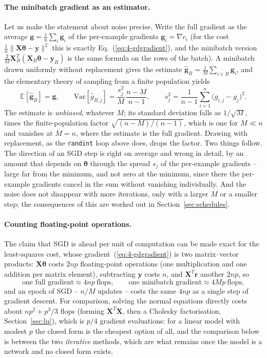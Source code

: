 \paragraph{The minibatch gradient as an estimator.}
Let us make the statement about noise precise.  Write the full gradient as
the average $\bm{g}=\frac1n\sum_i\bm{g}_i$ of the per-example gradients
$\bm{g}_i=\nabla c_i$ (for the cost $\frac1n\|\bm{X}\bm{\theta}-\bm{y}\|^{2}$
this is exactly Eq.~(\ref{eq:4-gdgradient}), and the minibatch version
$\frac{2}{M}\bm{X}_B^{T}(\bm{X}_B\bm{\theta}-\bm{y}_B)$ is the same formula
on the rows of the batch).  A minibatch drawn uniformly without replacement
gives the estimate $\hat{\bm{g}}_B=\frac1M\sum_{i\in B}\bm{g}_i$, and the
elementary theory of sampling from a finite population yields
\begin{equation}
  \mathbb{E}[\hat{\bm{g}}_B]=\bm{g},
  \qquad
  \mathrm{Var}[\hat g_{B,j}]=\frac{s_j^{2}}{M}\,\frac{n-M}{n-1},
  \qquad
  s_j^{2}=\frac{1}{n-1}\sum_{i=1}^{n}\bigl(g_{i,j}-g_j\bigr)^{2}.
  \label{eq:4-minibatchvar}
\end{equation}
The estimate is \emph{unbiased}, whatever $M$; its standard deviation falls
as $1/\sqrt{M}$, times the finite-population factor $\sqrt{(n-M)/(n-1)}$,
which is one for $M\ll n$ and vanishes at $M=n$, where the estimate is the
full gradient.  Drawing with replacement, as the \texttt{randint} loop above
does, drops the factor.  Two things follow.  The direction of an SGD step is
right on average and wrong in detail, by an amount that depends on
$\bm{\theta}$ through the spread $s_j$ of the per-example gradients -- large
far from the minimum, and not zero at the minimum, since there the
per-example gradients cancel in the sum without vanishing individually.  And
the noise does not disappear with more iterations, only with a larger $M$ or
a smaller step; the consequences of this are worked out in
Section~\ref{sec:schedules}.

\paragraph{Counting floating-point operations.}
The claim that SGD is ahead per unit of computation can be made exact for the
least-squares cost, whose gradient~(\ref{eq:4-gdgradient}) is two
matrix--vector products: $\bm{X}\bm{\theta}$ costs $2np$ floating-point
operations (one multiplication and one addition per matrix element),
subtracting $\bm{y}$ costs $n$, and $\bm{X}^{T}\bm{r}$ another $2np$, so
\begin{equation}
  \text{one full gradient}\approx4np\ \text{flops},
  \qquad
  \text{one minibatch gradient}\approx4Mp\ \text{flops},
  \label{eq:4-flops}
\end{equation}
and an epoch of SGD -- $n/M$ updates -- costs the same $4np$ as a single
step of gradient descent.  For comparison, solving the normal equations
directly costs about $np^{2}+p^{3}/3$ flops (forming
$\bm{X}^{T}\bm{X}$, then a Cholesky factorisation, Section~\ref{sec:lu}),
which is $p/4$ gradient evaluations: for a linear model with modest $p$ the
closed form is the cheapest option of all, and the comparison below is
between the two \emph{iterative} methods, which are what remains once the
model is a network and no closed form exists.

